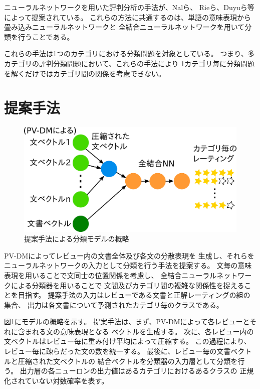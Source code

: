 \documentclass{ttisummary}
\makeatletter
\let\tti@includegraphics\includegraphics
\renewcommand{\includegraphics}[1]{\tti@includegraphics[width=\linewidth]{#1}}
\makeatother
\begin{document}
ニューラルネットワークを用いた評判分析の手法が、Nalら\cite{nal14}、
Rieら\cite{rie14}、Duyuら\cite{duyu15}等によって提案されている。
これらの方法に共通するのは、単語の意味表現から畳み込みニューラルネットワークと
全結合ニューラルネットワークを用いて分類を行うことである。

これらの手法は1つのカテゴリにおける分類問題を対象としている。
つまり、多カテゴリの評判分類問題において、これらの手法により
1カテゴリ毎に分類問題を解くだけではカテゴリ間の関係を考慮できない。



\section{提案手法}

\begin{figure}[t!]
  \includegraphics{fig/model.png}
  \caption{提案手法による分類モデルの概略}
  \label{fig:MyModel}
\end{figure}

PV-DMによってレビュー内の文書全体及び各文の分散表現を
生成し、それらをニューラルネットワークの入力として分類を行う手法を提案する。
文毎の意味表現を用いることで文同士の位置関係を考慮し、
全結合ニューラルネットワークによる分類器を用いることで
文間及びカテゴリ間の複雑な関係性を捉えることを目指す。
提案手法の入力はレビューである文書と正解レーティングの組の集合、
出力は各文書について予測されたカテゴリ毎のクラスである。

図\ref{fig:MyModel}にモデルの概略を示す。
提案手法は、まず、PV-DMによって各レビューとそれに含まれる文の意味表現となる
ベクトルを生成する。
次に、各レビュー内の文ベクトルはレビュー毎に重み付け平均によって圧縮する。
この過程により、レビュー毎に疎らだった文の数を統一する。
最後に、レビュー毎の文書ベクトルと圧縮された文ベクトルの
結合ベクトルを分類器の入力層として分類を行う。
出力層の各ニューロンの出力値はあるカテゴリにおけるあるクラスの
正規化されていない対数確率を表す。
\end{document}
